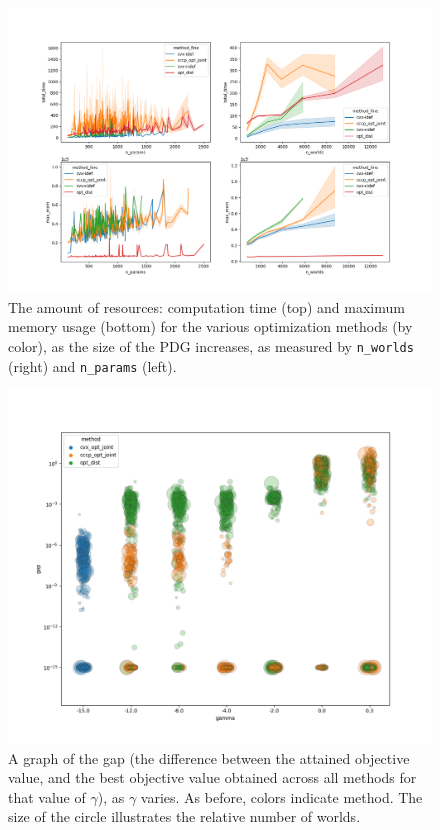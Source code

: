 \documentclass[twoside]{article}
\begin{document}
\begin{figure}
    \includegraphics[width=\linewidth]{figs/resources-fine}
    \caption{
        The amount of resources: computation time (top) and maximum memory usage (bottom) for the various optimization methods (by color), as the size of the PDG increases, as measured by \texttt{n\_worlds} (right) and \texttt{n\_params} (left).
     }\label{fig:resources}
\end{figure}

\begin{figure}
    \includegraphics[width=\linewidth]{figs/gamma-vs-gap-bettergap}
    \caption{
        A graph of the gap (the difference between the attained objective value, and the best objective value obtained across all methods for that value of $\gamma$),
        as $\gamma$ varies. As before, colors indicate method.
        The size of the circle illustrates the relative number of worlds.
    }\label{fig:gamma-v-gap}
\end{figure}
\end{document}

